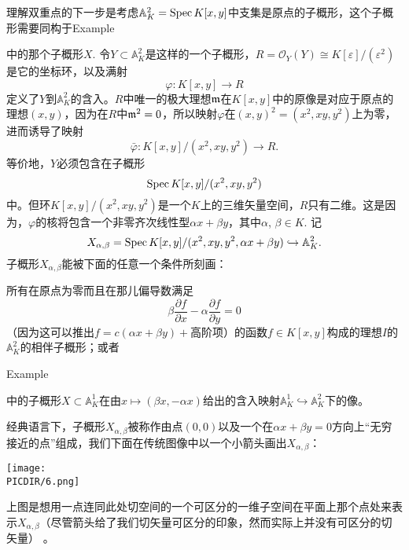 \begin{exa}[双重点]
理解双重点的下一步是考虑$\mathbb{A}_K^2=\operatorname{Spec} K[x,y]$中支集是原点的子概形，这个子概形需要同构于Example {{\addtocounter{thm}{-1}}\thethm{\addtocounter{thm}{1}}}中的那个子概形$X$. 令$Y\subset \mathbb{A}_K^2$是这样的一个子概形，$R=\mathscr{O}_Y(Y)\cong K[\varepsilon]/(\varepsilon^2)$是它的坐标环，以及满射
\[
	\varphi:K[x,y]\to R
\]
定义了$Y$到$\mathbb{A}_K^2$的含入。$R$中唯一的极大理想$\mathfrak{m}$在$K[x,y]$中的原像是对应于原点的理想$(x,y)$，因为在$R$中$\mathfrak{m}^2=0$，所以映射$\varphi$在$(x,y)^2=(x^2,xy,y^2)$上为零，进而诱导了映射
\[
	\bar\varphi:K[x,y]/(x^2,xy,y^2)\to R.
\]
等价地，$Y$必须包含在子概形
\[
	\operatorname{Spec} K[x,y]/(x^2,xy,y^2)
\]
中。但环$K[x,y]/(x^2,xy,y^2)$是一个$K$上的三维矢量空间，$R$只有二维。这是因为，$\varphi$的核将包含一个非零齐次线性型$\alpha x+\beta y$，其中$\alpha$, $\beta\in K$. 记
\[
	X_{\alpha,\beta}=\operatorname{Spec} K[x,y]/(x^2,xy,y^2,\alpha x+\beta y)\hookrightarrow \mathbb{A}_K^2.
\]
子概形$X_{\alpha,\beta}$能被下面的任意一个条件所刻画：

\begin{compactenum}[(i)]
\item 所有在原点为零而且在那儿偏导数满足
\[
	\beta\frac{\partial f}{\partial x}-\alpha\frac{\partial f}{\partial y}=0
\]
（因为这可以推出$f=c(\alpha x+\beta y)+\text{高阶项}$）的函数$f\in K[x,y]$构成的理想$I$的$\mathbb{A}^2_K$的相伴子概形；或者

\item Example {{\addtocounter{thm}{-1}}\thethm{\addtocounter{thm}{1}}}中的子概形$X\subset \mathbb{A}_K^1$在由$x\mapsto (\beta x,-\alpha x)$给出的含入映射$\mathbb{A}_K^1\hookrightarrow\mathbb{A}_K^2$下的像。
\end{compactenum}

经典语言下，子概形$X_{\alpha,\beta}$被称作由点$(0,0)$以及一个在$\alpha x+\beta y=0$方向上“无穷接近的点”组成，我们下面在传统图像中以一个小箭头画出$X_{\alpha,\beta}$：
\begin{center}\texttt{[image: \\PICDIR/6.png]}\end{center}
上图是想用一点连同此处切空间的一个可区分的一维子空间在平面上那个点处来表示$X_{\alpha,\beta}$（尽管箭头给了我们切矢量可区分的印象，然而实际上并没有可区分的切矢量）%
。
\end{exa}

